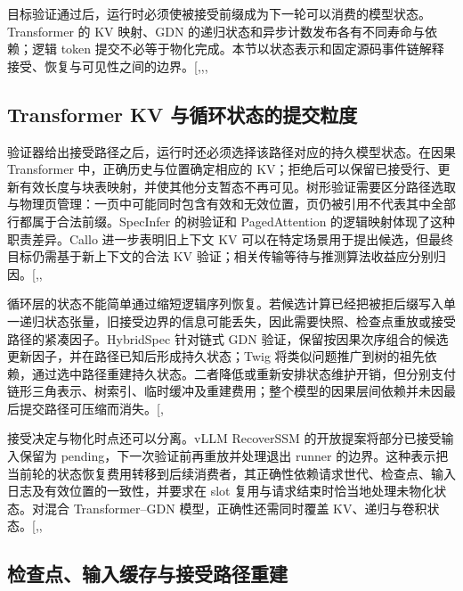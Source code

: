 \documentclass[
  a4paper,
  UTF8,
  fontset=none,
  zihao=5]{ctexart}
\begin{document}
目标验证通过后，运行时必须使被接受前缀成为下一轮可以消费的模型状态。Transformer
的 KV 映射、GDN 的递归状态和异步计数发布各有不同寿命与依赖；逻辑 token
提交不必等于物化完成。本节以状态表示和固定源码事件链解释接受、恢复与可见性之间的边界。{[},,,\citeproc{ref-ascend-pin}{17}{]}

\subsection{Transformer KV 与循环状态的提交粒度}\label{commit-state}

验证器给出接受路径之后，运行时还必须选择该路径对应的持久模型状态。在因果
Transformer 中，正确历史与位置确定相应的
KV；拒绝后可以保留已接受行、更新有效长度与块表映射，并使其他分支暂态不再可见。树形验证需要区分路径选取与物理页管理：一页中可能同时包含有效和无效位置，页仍被引用不代表其中全部行都属于合法前缀。SpecInfer
的树验证和 PagedAttention 的逻辑映射体现了这种职责差异。Callo
进一步表明旧上下文 KV
可以在特定场景用于提出候选，但最终目标仍需基于新上下文的合法 KV
验证；相关传输等待与推测算法收益应分别归因。{[},,\citeproc{ref-callo}{63}{]}

循环层的状态不能简单通过缩短逻辑序列恢复。若候选计算已经把被拒后缀写入单一递归状态张量，旧接受边界的信息可能丢失，因此需要快照、检查点重放或接受路径的紧凑因子。HybridSpec
针对链式 GDN
验证，保留按因果次序组合的候选更新因子，并在路径已知后形成持久状态；Twig
将类似问题推广到树的祖先依赖，通过选中路径重建持久状态。二者降低或重新安排状态维护开销，但分别支付链形三角表示、树索引、临时缓冲及重建费用；整个模型的因果层间依赖并未因最后提交路径可压缩而消失。{[},\citeproc{ref-twig}{15}{]}

接受决定与物化时点还可以分离。vLLM RecoverSSM
的开放提案将部分已接受输入保留为 pending，下一次验证前再重放并处理退出
runner
的边界。这种表示把当前轮的状态恢复费用转移到后续消费者，其正确性依赖请求世代、检查点、输入日志及有效位置的一致性，并要求在
slot 复用与请求结束时恰当地处理未物化状态。对混合 Transformer--GDN
模型，正确性还需同时覆盖
KV、递归与卷积状态。{[},,\citeproc{ref-pr-recover}{30}{]}

\subsection{检查点、输入缓存与接受路径重建}\label{state-representations}
\end{document}
